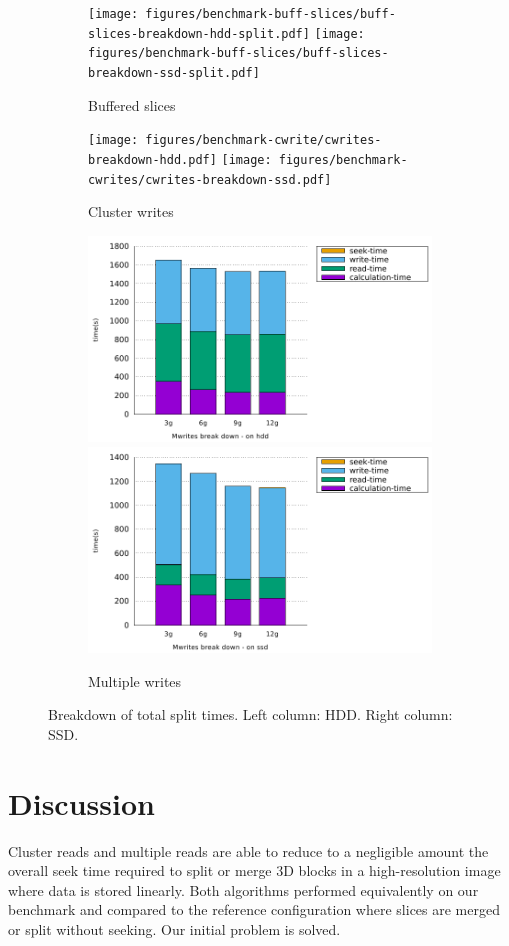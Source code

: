 \documentclass[10pt, conference, compsocconf]{IEEEtran}
\begin{document}
\begin{figure}
  \begin{subfigure}[b]{\columnwidth}
    \texttt{[image: figures/benchmark-buff-slices/buff-slices-breakdown-hdd-split.pdf]}
    \texttt{[image: figures/benchmark-buff-slices/buff-slices-breakdown-ssd-split.pdf]}
    \caption{Buffered slices}
  \end{subfigure}
  \begin{subfigure}[b]{\columnwidth}
    \texttt{[image: figures/benchmark-cwrite/cwrites-breakdown-hdd.pdf]}
    \texttt{[image: figures/benchmark-cwrites/cwrites-breakdown-ssd.pdf]}
    \caption{Cluster writes}
  \end{subfigure}
  \begin{subfigure}[b]{\columnwidth}
    \includegraphics[width=0.45\columnwidth]{figures/benchmark-mwrites/mwrites-breakdown-hdd.pdf}
    \includegraphics[width=0.45\columnwidth]{figures/benchmark-mwrites/mwrites-breakdown-ssd.pdf}
    \caption{Multiple writes}
  \end{subfigure}
  \caption{Breakdown of total split times. Left column: HDD. Right column: SSD.}
  \label{fig:breakdowns-ssd-split}
\end{figure}

\section{Discussion}
\label{sec:discussion}

Cluster reads and multiple reads are able to reduce to a negligible
amount the overall seek time required to split or merge 3D blocks in a
high-resolution image where data is stored linearly. Both algorithms
performed equivalently on our benchmark and compared to the reference
configuration where slices are merged or split without seeking. Our
initial problem is solved.
\end{document}
